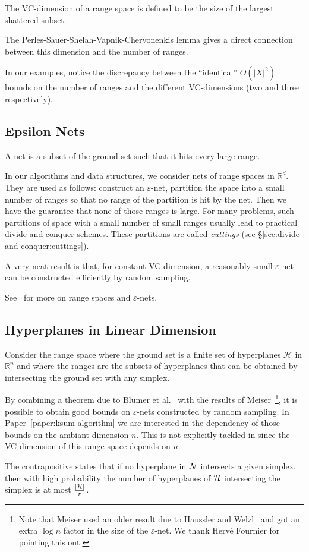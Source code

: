 The VC-dimension of a range space is defined to be the size of the largest
shattered subset.


The Perles-Sauer-Shelah-Vapnik-Chervonenkis lemma gives a direct connection
between this dimension and the number of ranges.

In our examples, notice the discrepancy between the ``identical''
\(O({|X|}^2)\) bounds on the number of ranges and the different VC-dimensions
(two and three respectively).

\subsection{Epsilon Nets}
\label{sec:divide-and-conquer:epsilon-nets}

A net is a subset of the ground set such that it hits every large range.
%

%
In our algorithms and data structures,
%
we consider nets of range spaces in \(\mathbb{R}^d\).
They are used as follows: construct an \(\varepsilon\)-net,
partition the space into a small number of ranges so that no range of the
partition is hit by the net. Then we have the guarantee that none of those
ranges is large.
%
For many problems,
such partitions of space with a small number of
small ranges usually lead to practical divide-and-conquer schemes.
These partitions are called \emph{cuttings} (see
\S\ref{sec:divide-and-conquer:cuttings}).

A very neat result is that, for constant VC-dimension, a reasonably small
\(\varepsilon\)-net can be constructed efficiently by random sampling.


See~\cite[Section~40.4]{CMR04} for more on range spaces and \(\varepsilon\)-nets.

\subsection{Hyperplanes in Linear Dimension}

Consider the range space where the ground set is a finite set of hyperplanes
\(\mathcal{H}\) in \(\mathbb{R}^n\)
and where the ranges are the subsets of hyperplanes that can be obtained by
intersecting the ground set with any simplex.

By combining a theorem due to Blumer et
al.~\cite{BEHW89} with the results of Meiser~\cite{M93}\footnote{Note that
Meiser used an older result due to Haussler and Welzl~\cite{H87} and got an
extra $\log n$ factor in the size of the $\varepsilon$-net. We thank Hervé
Fournier for pointing this out.}, it is possible to
obtain good bounds on \(\varepsilon\)-nets constructed by
random sampling.
%
In Paper~\ref{paper:ksum-algorithm}
we are interested in the dependency of those bounds on the ambiant dimension
\(n\).
This is not explicitly tackled in 
since the VC-dimension of this range space depends on \(n\).
%

%
The contrapositive states that if no hyperplane in \(\mathcal{N}\) intersects
a given simplex, then with high probability the number of hyperplanes of
\(\mathcal{H}\) intersecting the simplex is at most \(\frac{| \mathcal{H} |}{r}\).

